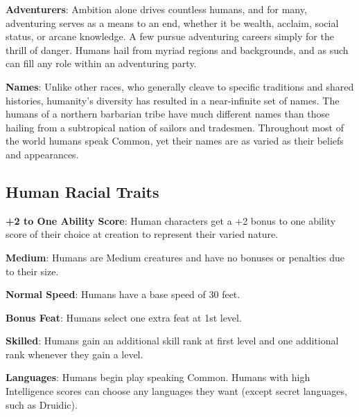 \textbf{Adventurers}: Ambition alone drives countless humans, and for many, adventuring serves as a means to an end, whether it be wealth, acclaim, social status, or arcane knowledge. A few pursue adventuring careers simply for the thrill of danger. Humans hail from myriad regions and backgrounds, and as such can fill any role within an adventuring party.
				
\textbf{Names}: Unlike other races, who generally cleave to specific traditions and shared histories, humanity's diversity has resulted in a near-infinite set of names. The humans of a northern barbarian tribe have much different names than those hailing from a subtropical nation of sailors and tradesmen. Throughout most of the world humans speak Common, yet their names are as varied as their beliefs and appearances.
							
\subsection{Human Racial Traits}

				
\textbf{+2 to One Ability Score}: Human characters get a +2 bonus to one ability score of their choice at creation to represent their varied nature.
				
\textbf{Medium}: Humans are Medium creatures and have no bonuses or penalties due to their size.
				
\textbf{Normal Speed}: Humans have a base speed of 30 feet.
				
\textbf{Bonus Feat}: Humans select one extra feat at 1st level.
				
\textbf{Skilled}: Humans gain an additional skill rank at first level and one additional rank whenever they gain a level.
				
\textbf{Languages}: Humans begin play speaking Common. Humans with high Intelligence scores can choose any languages they want (except secret languages, such as Druidic).
        	